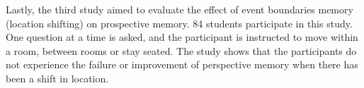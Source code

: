 Lastly, the third study aimed to evaluate the effect of event boundaries memory (location
shifting) on prospective memory. 84 students participate in this study. One question at a time
is asked, and the participant is instructed to move within a room, between rooms or stay seated.
The study shows that the participants do not experience the failure or improvement of perspective
memory when there has been a shift in location.
